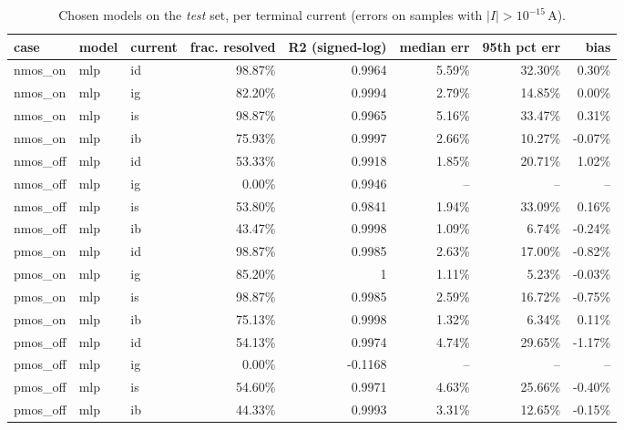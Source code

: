 \begin{table}[H]
\centering
{\small
\begin{tabular}{lllrrrrr}
\toprule
case & model & current & frac. resolved & R2 (signed-log) & median err & 95th pct err & bias \\
\midrule
nmos\_on & mlp & id & 98.87\% & 0.9964 & 5.59\% & 32.30\% & 0.30\% \\
nmos\_on & mlp & ig & 82.20\% & 0.9994 & 2.79\% & 14.85\% & 0.00\% \\
nmos\_on & mlp & is & 98.87\% & 0.9965 & 5.16\% & 33.47\% & 0.31\% \\
nmos\_on & mlp & ib & 75.93\% & 0.9997 & 2.66\% & 10.27\% & -0.07\% \\
nmos\_off & mlp & id & 53.33\% & 0.9918 & 1.85\% & 20.71\% & 1.02\% \\
nmos\_off & mlp & ig & 0.00\% & 0.9946 & -- & -- & -- \\
nmos\_off & mlp & is & 53.80\% & 0.9841 & 1.94\% & 33.09\% & 0.16\% \\
nmos\_off & mlp & ib & 43.47\% & 0.9998 & 1.09\% & 6.74\% & -0.24\% \\
pmos\_on & mlp & id & 98.87\% & 0.9985 & 2.63\% & 17.00\% & -0.82\% \\
pmos\_on & mlp & ig & 85.20\% & 1 & 1.11\% & 5.23\% & -0.03\% \\
pmos\_on & mlp & is & 98.87\% & 0.9985 & 2.59\% & 16.72\% & -0.75\% \\
pmos\_on & mlp & ib & 75.13\% & 0.9998 & 1.32\% & 6.34\% & 0.11\% \\
pmos\_off & mlp & id & 54.13\% & 0.9974 & 4.74\% & 29.65\% & -1.17\% \\
pmos\_off & mlp & ig & 0.00\% & -0.1168 & -- & -- & -- \\
pmos\_off & mlp & is & 54.60\% & 0.9971 & 4.63\% & 25.66\% & -0.40\% \\
pmos\_off & mlp & ib & 44.33\% & 0.9993 & 3.31\% & 12.65\% & -0.15\% \\
\bottomrule
\end{tabular}
}
\caption{Chosen models on the \emph{test} set, per terminal current (errors on samples with $|I|>10^{-15}$\,A).}
\label{tab:chosen}
\end{table}

